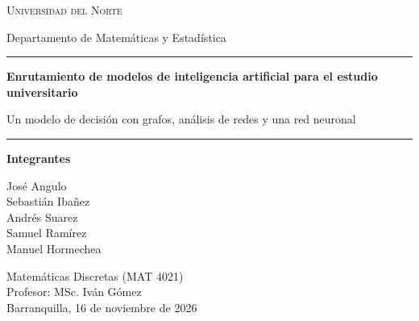 \documentclass[12pt,letterpaper]{article}
\begin{document}
\begin{titlepage}
\centering
{\large\scshape Universidad del Norte\par}
{\normalsize Departamento de Matemáticas y Estadística\par}
\vspace{3.2cm}
{\color{tinta}\rule{\linewidth}{1.2pt}\par}
\vspace{0.6cm}
{\LARGE\bfseries\color{tinta} Enrutamiento de modelos de inteligencia artificial para el estudio universitario\par}
\vspace{0.5cm}
{\large Un modelo de decisión con grafos, análisis de redes y una red neuronal\par}
\vspace{0.6cm}
{\color{tinta}\rule{\linewidth}{1.2pt}\par}
\vspace{2.2cm}
{\large\bfseries Integrantes\par}
\vspace{0.3cm}
José Angulo\\ Sebastián Ibañez\\ Andrés Suarez\\ Samuel Ramírez\\ Manuel Hormechea\par
\vfill
Matemáticas Discretas (MAT 4021)\\
Profesor: MSc. Iván Gómez\\[0.3cm]
Barranquilla, 16 de noviembre de 2026\par
\end{titlepage}

\end{document}
